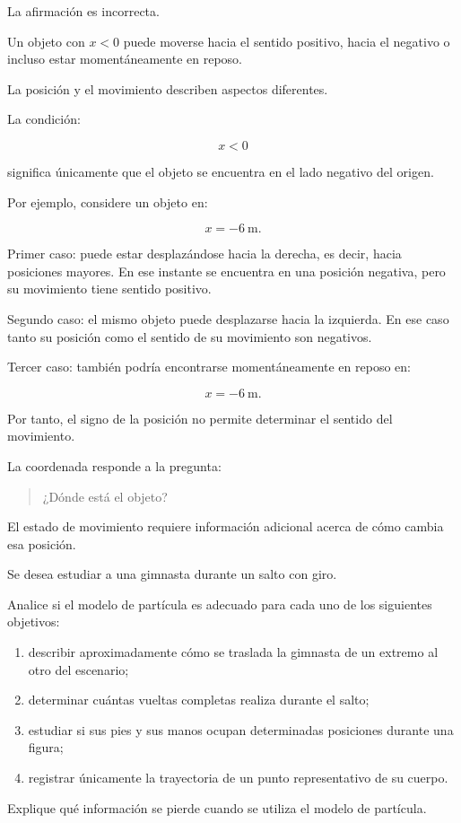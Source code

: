 \begin{respuesta}
La afirmación es incorrecta.

Un objeto con \(x<0\) puede moverse hacia el sentido positivo, hacia el negativo o incluso estar momentáneamente en reposo.
\end{respuesta}

\begin{explicacion}
La posición y el movimiento describen aspectos diferentes.

La condición:

\[ x<0 \]

significa únicamente que el objeto se encuentra en el lado negativo del origen.

Por ejemplo, considere un objeto en:

\[ x=-\SI{6}{\meter}. \]

Primer caso: puede estar desplazándose hacia la derecha, es decir, hacia posiciones mayores. En ese instante se encuentra en una posición negativa, pero su movimiento tiene sentido positivo.

Segundo caso: el mismo objeto puede desplazarse hacia la izquierda. En ese caso tanto su posición como el sentido de su movimiento son negativos.

Tercer caso: también podría encontrarse momentáneamente en reposo en:

\[ x=-\SI{6}{\meter}. \]

Por tanto, el signo de la posición no permite determinar el sentido del movimiento.

\begin{interpretacion}
La coordenada responde a la pregunta:

\begin{quote}
¿Dónde está el objeto?
\end{quote}

El estado de movimiento requiere información adicional acerca de cómo cambia esa posición.
\end{interpretacion}
\end{explicacion}


\begin{ejercicio}
Se desea estudiar a una gimnasta durante un salto con giro.

Analice si el modelo de partícula es adecuado para cada uno de los siguientes objetivos:

\begin{enumerate}[label=\alph*)]
    \item describir aproximadamente cómo se traslada la gimnasta de un extremo al otro del escenario;
    \item determinar cuántas vueltas completas realiza durante el salto;
    \item estudiar si sus pies y sus manos ocupan determinadas posiciones durante una figura;
    \item registrar únicamente la trayectoria de un punto representativo de su cuerpo.
\end{enumerate}

Explique qué información se pierde cuando se utiliza el modelo de partícula.
\end{ejercicio}

